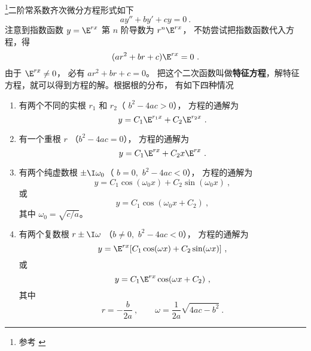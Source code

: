 

\begin{issues}
\end{issues}




\footnote{参考 \cite{同济高}}二阶常系数齐次微分方程形式如下
\begin{equation}
ay'' + by' + cy = 0~.
\end{equation}
注意到指数函数 $y = \E^{rx}$ 第 $n$ 阶导数为 $r^n \E^{rx}$， 不妨尝试把指数函数代入方程，得
\begin{equation}
(a r^2 + br + c) \E^{rx} = 0~.
\end{equation}
由于 $\E^{rx} \ne 0$， 必有 $a r^2 + br + c = 0$。 把这个二次函数叫做\textbf{特征方程}，解特征方程，就可以得到方程的解。根据根的分布， 有如下四种情况

\begin{enumerate}
\item 有两个不同的实根 $r_1$ 和  $r_2$（ $b^2 - 4ac > 0$）， 方程的通解为
\begin{equation}
y = C_1 \E^{r_1 x} + C_2 \E^{r_2 x}~.
\end{equation}
\item 有一个重根 $r$ （$b^2 - 4ac = 0$）， 方程的通解为
\begin{equation}\label{eq_Ode2_4}
y = C_1 \E^{rx} + C_2 x \E^{rx}~.
\end{equation}
\item 有两个纯虚数根 $\pm \I \omega_0$（ $b = 0,\,\, b^2 - 4ac < 0$）， 方程的通解为
\begin{equation}
y = C_1\cos(\omega_0 x) + C_2 \sin(\omega_0 x)~,
\end{equation}
或 
\begin{equation}
y = C_1\cos(\omega_0 x + C_2)~,
\end{equation} 
其中 $\omega_0 = \sqrt{c/a}$。 

\item 有两个复数根 $r \pm \I\omega$ （$b \ne 0,\,\, b^2 - 4ac < 0$）， 方程的通解为
\begin{equation}\label{eq_Ode2_7}
y = \E^{rx} [ C_1\cos(\omega x) + C_2\sin(\omega x) ]~,
\end{equation} 
或 
\begin{equation}
y = C_1\E^{rx}\cos(\omega x + C_2)~,
\end{equation} 
其中
\begin{equation}
r =  - \frac{b}{2a} ~,\qquad \omega  = \frac{1}{2a}\sqrt{4ac - b^2} ~.
\end{equation}

\end{enumerate}

